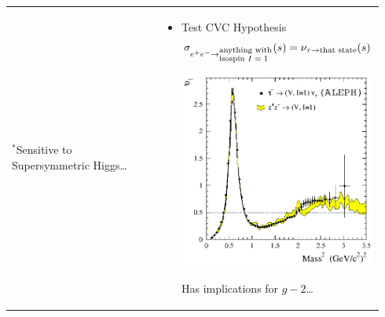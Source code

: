 \begin{slide*}
\begin{minipage}[t]{\linewidth}
\begin{tabular}{p{0.47\linewidth} c p{0.47\linewidth}}
\begin{minipage}{\linewidth}
\begin{itemize}
	$^*$Sensitive to Supersymmetric Higgs\ldots
    \end{itemize}
  \end{minipage} & &
  \begin{minipage}{\linewidth}
    \begin{itemize}
      \item Test CVC Hypothesis
	\[ \sigma_{e^+e^- \to \mbox{}^{\mbox{\scriptsize anything with}}_{\mbox{\scriptsize isospin $I=1$}}}(s)
           = \nu_{\tau \to \mbox{\scriptsize that state}}(s) \]
	\begin{center}
	  \includegraphics[width=\linewidth, height=4 cm]{tau_spectralfunction.eps}
	\end{center}
	Has implications for $g-2$\ldots
    \end{itemize}
  \end{minipage} \\
\end{tabular}

\end{minipage}
\end{slide*}


